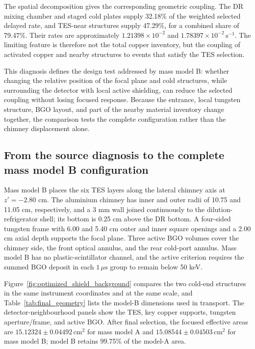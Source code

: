 \documentclass[11pt]{article}
\newcommand{\cps}{\ensuremath{\,\mathrm{s^{-1}}}}
\begin{document}
The spatial decomposition gives the corresponding geometric coupling. The DR mixing chamber and staged cold plates supply 32.18\% of the weighted selected delayed rate, and TES-near structures supply 47.29\%, for a combined share of 79.47\%. Their rates are approximately $1.21398\times10^{-2}$ and $1.78397\times10^{-2}\cps$. The limiting feature is therefore not the total copper inventory, but the coupling of activated copper and nearby structures to events that satisfy the TES selection.

This diagnosis defines the design test addressed by mass model B: whether changing the relative position of the focal plane and cold structures, while surrounding the detector with local active shielding, can reduce the selected coupling without losing focused response. Because the entrance, local tungsten structure, BGO layout, and part of the nearby material inventory change together, the comparison tests the complete configuration rather than the chimney displacement alone.

\FloatBarrier

\subsection{From the source diagnosis to the complete mass model B configuration}
\label{subsec:optimized_shield_results}

Mass model B places the six TES layers along the lateral chimney axis at $z'=-2.80$ cm. The aluminium chimney has inner and outer radii of 10.75 and 11.05 cm, respectively, and a 3 mm wall joined continuously to the dilution-refrigerator shell; its bottom is 0.25 cm above the DR bottom. A four-sided tungsten frame with 6.00 and 5.40 cm outer and inner square openings and a 2.00 cm axial depth supports the focal plane. Three active BGO volumes cover the chimney side, the front optical annulus, and the rear cold-port annulus. Mass model B has no plastic-scintillator channel, and the active criterion requires the summed BGO deposit in each $1\,\mu\mathrm{s}$ group to remain below 50 keV.

Figure~\ref{fig:optimized_shield_background} compares the two cold-end
structures in the same instrument coordinates and at the same scale, and
Table~\ref{tab:final_geometry} lists the model-B dimensions used in transport.
The detector-neighbourhood panels show the TES, key copper supports, tungsten
aperture/frame, and active BGO. After final selection, the focused effective
areas are $15.12324\pm0.04492\,\mathrm{cm^2}$ for mass model A and
$15.08544\pm0.04503\,\mathrm{cm^2}$ for mass model B; model B retains 99.75\%
of the model-A area.
\end{document}
